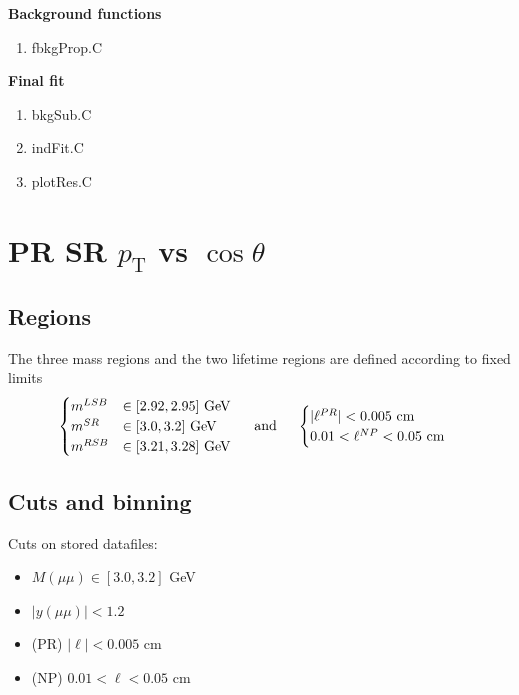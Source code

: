 \documentclass{article}
\newcommand{\pt}{p_\text{T}}
\newcommand{\cost}{\cos\theta}
\begin{document}
\textbf{Background functions}
\begin{enumerate}
\item fbkgProp.C
\end{enumerate}

\textbf{Final fit}
\begin{enumerate}
\item bkgSub.C
\item indFit.C
\item plotRes.C
\end{enumerate}

\pagebreak

\section{PR SR $\pt$ vs $\cost$}
\subsection{Regions} 

The three mass regions and the two lifetime regions are defined according to fixed limits
\begin{equation}\begin{cases}
m^{LSB}&\in[2.92, 2.95] \text{ GeV}\\
m^{SR}&\in[3.0, 3.2]  \text{ GeV}\\
m^{RSB}&\in[3.21, 3.28]  \text{ GeV}\\
\end{cases}\hspace{0.5cm}\text{and}\hspace{0.5cm}
\begin{cases}
|\ell^{PR}| < 0.005\text{ cm} \\
0.01 < \ell^{NP} < 0.05\text{ cm}
\end{cases}
\end{equation}

\subsection{Cuts and binning} 

Cuts on stored datafiles:
\begin{itemize}
\item $M(\mu\mu)\in[3.0,3.2]$ GeV
\item $|y(\mu\mu)|<1.2$
\item (PR) $|\ell|<0.005$ cm
\item (NP) $0.01 < \ell < 0.05$ cm
\end{itemize}
\end{document}
